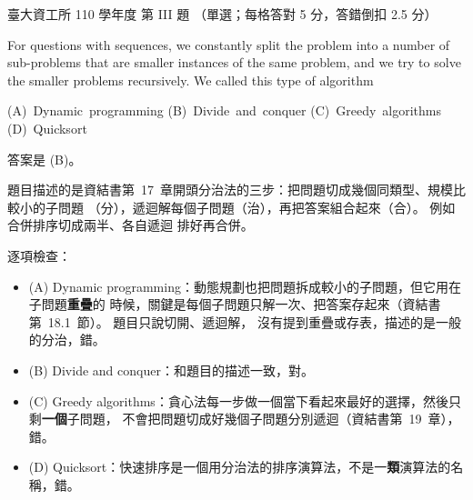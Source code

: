 \begin{pastexam}[label={px:ntu-110-dsaa-03}]{臺大資工所 110 學年度 第 III 題}
（單選；每格答對 5 分，答錯倒扣 2.5 分）

For questions with sequences, we constantly split the problem into a number of sub-problems that
are smaller instances of the same problem, and we try to solve the smaller problems recursively.
We called this type of algorithm \underline{}

(A)~Dynamic~programming \qquad (B)~Divide~and~conquer \qquad (C)~Greedy~algorithms\\
(D)~Quicksort
\end{pastexam}

\begin{pastsoln}
答案是 (B)。

題目描述的是資結書第~17~章開頭分治法的三步：把問題切成幾個同類型、規模比較小的子問題
（分），遞迴解每個子問題（治），再把答案組合起來（合）。 例如合併排序切成兩半、各自遞迴
排好再合併。

逐項檢查：
\begin{itemize}
\item (A) Dynamic programming：動態規劃也把問題拆成較小的子問題，但它用在子問題\textbf{重疊}的
時候，關鍵是每個子問題只解一次、把答案存起來（資結書第~18.1~節）。 題目只說切開、遞迴解，
沒有提到重疊或存表，描述的是一般的分治，錯。
\item (B) Divide and conquer：和題目的描述一致，對。
\item (C) Greedy algorithms：貪心法每一步做一個當下看起來最好的選擇，然後只剩\textbf{一個}子問題，
不會把問題切成好幾個子問題分別遞迴（資結書第~19~章），錯。
\item (D) Quicksort：快速排序是一個用分治法的排序演算法，不是一\textbf{類}演算法的名稱，錯。
\end{itemize}
\end{pastsoln}
